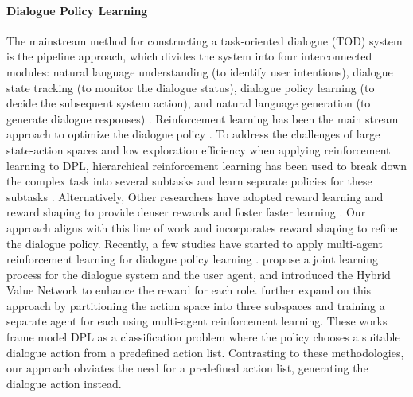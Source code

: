 \documentclass[letterpaper]{article} %
\begin{document}
\paragraph{Dialogue Policy Learning}
The mainstream method for constructing a task-oriented dialogue (TOD) system is the pipeline approach, which divides the system into four interconnected modules: natural language understanding (to identify user intentions), dialogue state tracking (to monitor the dialogue status), dialogue policy learning (to decide the subsequent system action), and natural language generation (to generate dialogue responses) \citet{kwan2023survey}.
Reinforcement learning has been the main stream approach to optimize the dialogue policy \cite{levinLearningDialogueStrategies1997,singhReinforcementLearningSpoken2000,gasic-etal-2010-gaussian}.
To address the challenges of large state-action spaces and low exploration efficiency when applying reinforcement learning to DPL, hierarchical reinforcement learning has been used to break down the complex task into several subtasks and learn separate policies for these subtasks \cite{budzianowski-etal-2017-sub,peng-etal-2017-composite,kristianto-etal-2018-autonomous,tang-etal-2018-subgoal}. 
Alternatively, Other researchers have adopted reward learning and reward shaping to provide denser rewards and foster faster learning \cite{su-etal-2015-reward,su-etal-2016-line,wang-etal-2020-learning-efficient}.
Our approach aligns with this line of work and incorporates reward shaping to refine the dialogue policy.
Recently, a few studies have started to apply multi-agent reinforcement learning for dialogue policy learning \cite{liuIterativePolicyLearning2017,zhang-etal-2020-learning}. \citet{takanobu-etal-2020-multi} propose a joint learning process for the dialogue system and the user agent, and introduced the Hybrid Value Network to enhance the reward for each role. \citet{wang-wong-2021-collaborative} further expand on this approach by partitioning the action space into three subspaces and training a separate agent for each using multi-agent reinforcement learning. These works frame model DPL as a classification problem where the policy chooses a suitable dialogue action from a predefined action list. Contrasting to these methodologies, our approach obviates the need for a predefined action list, generating the dialogue action instead.
\end{document}
